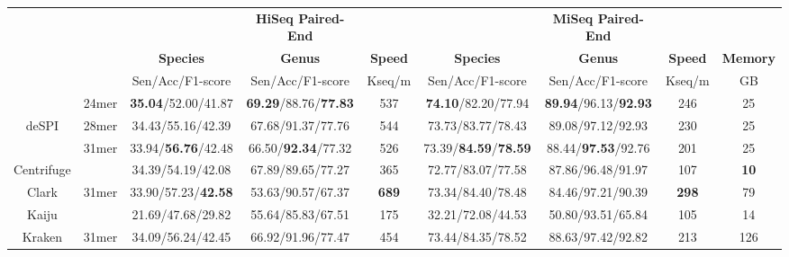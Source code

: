 \documentclass[a0,portrait]{a0poster}
\begin{document}
\begin{multicols}{2}
\begin{center}\vspace{1cm}
\footnotesize
\begin{tabular}{ccccc|ccc|c}
\toprule
& & & \textbf{HiSeq Paired-End} & && \textbf{MiSeq Paired-End} & & \\
& & \textbf{Species} & \textbf{Genus} & \textbf{Speed} & \textbf{Species} & \textbf{Genus} & \textbf{Speed} & \textbf{Memory}\\
\cline{3-5}\cline{6-9}
& & Sen/Acc/F1-score & Sen/Acc/F1-score & Kseq/m &Sen/Acc/F1-score & Sen/Acc/F1-score & Kseq/m & GB\\
\midrule
& 24mer & \textbf{35.04}/52.00/41.87 & \textbf{69.29}/88.76/\textbf{77.83} & 537 &\textbf{74.10}/82.20/77.94 & \textbf{89.94}/96.13/\textbf{92.93} & 246& 25\\
deSPI & 28mer & 34.43/55.16/42.39 & 67.68/91.37/77.76 & 544 &73.73/83.77/78.43 & 89.08/97.12/92.93 & 230 & 25\\
& 31mer & 33.94/\textbf{56.76}/42.48 & 66.50/\textbf{92.34}/77.32 & 526 & 73.39/\textbf{84.59}/\textbf{78.59} & 88.44/\textbf{97.53}/92.76 & 201 & 25\\
Centrifuge && 34.39/54.19/42.08 & 67.89/89.65/77.27 & 365 &72.77/83.07/77.58 & 87.86/96.48/91.97 & 107 & \textbf{10} \\
Clark & 31mer & 33.90/57.23/\textbf{42.58} & 53.63/90.57/67.37 & \textbf{689} & 73.34/84.40/78.48 & 84.46/97.21/90.39 & \textbf{298} & 79\\
Kaiju && 21.69/47.68/29.82 & 55.64/85.83/67.51 & 175  & 32.21/72.08/44.53 & 50.80/93.51/65.84 & 105 & 14\\
Kraken & 31mer & 34.09/56.24/42.45 & 66.92/91.96/77.47 & 454 & 73.44/84.35/78.52 & 88.63/97.42/92.82 & 213 & 126 \\
\bottomrule
\end{tabular}
\end{center}\vspace{1cm}


\end{multicols}
\end{document}
